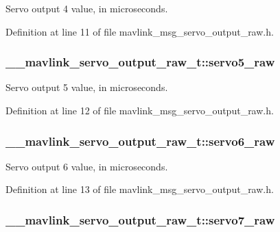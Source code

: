Servo output 4 value, in microseconds. 



Definition at line 11 of file mavlink\-\_\-msg\-\_\-servo\-\_\-output\-\_\-raw.\-h.

\hypertarget{struct____mavlink__servo__output__raw__t_a2cc4f07c7398f753b56acd16f195df6a}{
\subsubsection[{servo5\-\_\-raw}]{ \-\_\-\-\_\-mavlink\-\_\-servo\-\_\-output\-\_\-raw\-\_\-t\-::servo5\-\_\-raw}}\label{struct____mavlink__servo__output__raw__t_a2cc4f07c7398f753b56acd16f195df6a}


Servo output 5 value, in microseconds. 



Definition at line 12 of file mavlink\-\_\-msg\-\_\-servo\-\_\-output\-\_\-raw.\-h.

\hypertarget{struct____mavlink__servo__output__raw__t_a101f4294794034f15a5afe3a1e980b2e}{
\subsubsection[{servo6\-\_\-raw}]{ \-\_\-\-\_\-mavlink\-\_\-servo\-\_\-output\-\_\-raw\-\_\-t\-::servo6\-\_\-raw}}\label{struct____mavlink__servo__output__raw__t_a101f4294794034f15a5afe3a1e980b2e}


Servo output 6 value, in microseconds. 



Definition at line 13 of file mavlink\-\_\-msg\-\_\-servo\-\_\-output\-\_\-raw.\-h.

\hypertarget{struct____mavlink__servo__output__raw__t_acc5571463987b3d5079ab1afb2556895}{
\subsubsection[{servo7\-\_\-raw}]{ \-\_\-\-\_\-mavlink\-\_\-servo\-\_\-output\-\_\-raw\-\_\-t\-::servo7\-\_\-raw}}\label{struct____mavlink__servo__output__raw__t_acc5571463987b3d5079ab1afb2556895}


